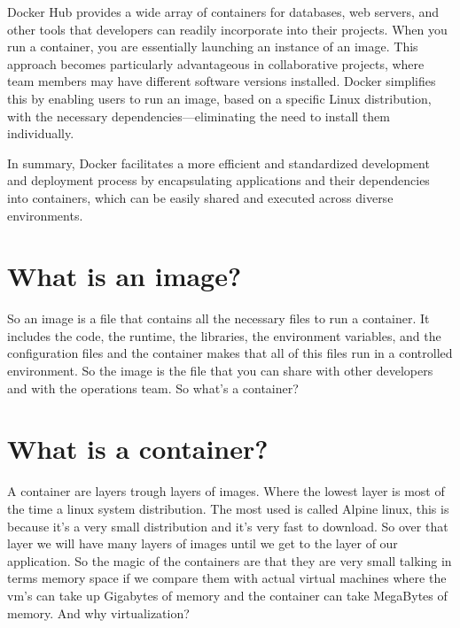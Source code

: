 \documentclass{article}
\begin{document}
Docker Hub provides a wide array of containers for databases, web servers, and other tools that developers can readily incorporate into their 
projects. When you run a container, you are essentially launching an instance of an image. This approach becomes particularly advantageous in 
collaborative projects, where team members may have different software versions installed. Docker simplifies this by enabling users to run an 
image, based on a specific Linux distribution, with the necessary dependencies—eliminating the need to install them individually.

In summary, Docker facilitates a more efficient and standardized development and deployment process by encapsulating applications and 
their dependencies into containers, which can be easily shared and executed across diverse environments.

\section*{What is an image?}
So an image is a file that contains all the necessary files to run a container. It includes the code, the runtime, 
the libraries, the environment variables, and the configuration files and the container makes that all of this files run in a controlled 
environment. So the image is the file that you can share with other developers and with the operations team. So what's a container?


\section*{What is a container?}

A container are layers trough layers of images. Where the lowest layer is most of the time a linux system distribution. The most used is called Alpine
linux, this is because it's a very small distribution and it's very fast to download. So over that layer we will have many layers of images until we get 
to the layer of our application. So the magic of the containers are that they are very small talking in terms memory space if we compare them 
with actual virtual machines where the vm's can take up Gigabytes of memory and the container can take MegaBytes of memory. And why virtualization? 
\end{document}
